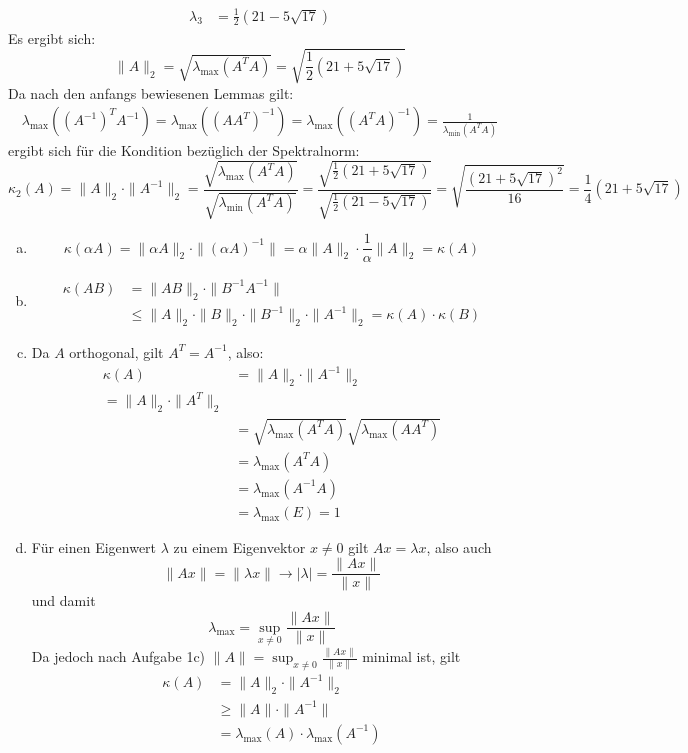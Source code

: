 \documentclass{mywork}
\begin{document}
\begin{aufgabe}
\begin{align*}
		\lambda_3&=\frac 12(21-5\sqrt{17})
	\end{align*}
	Es ergibt sich:
	\[
		\|A\|_2=\sqrt{\lambda_{\text{max}}(A^TA)}=\sqrt{\frac 12(21+5\sqrt{17})}
	\]
	Da nach den anfangs bewiesenen Lemmas gilt:
	\begin{align*}
		\lambda_{\text{max}}((A^{-1})^TA^{-1})
		=\lambda_{\text{max}}((AA^T)^{-1})
		=\lambda_{\text{max}}((A^TA)^{-1})
		=\frac 1{\lambda_{\text{min}}(A^TA)}
	\end{align*}
	ergibt sich für die Kondition bezüglich der Spektralnorm:
	\[
		\kappa_2(A)
		=\|A\|_2\cdot\|A^{-1}\|_2
		=\frac{\sqrt{\lambda_{\text{max}}(A^TA)}}{\sqrt{\lambda_{\text{min}}(A^TA)}}
		=\frac {\sqrt{\frac 12(21+5\sqrt{17})}}{\sqrt{\frac 12(21-5\sqrt{17})}}
		=\sqrt{\frac{(21+5\sqrt{17})^2}{16}}
		=\frac 14(21+5\sqrt{17})
	\]

\end{aufgabe}

\begin{aufgabe}
	\begin{enumerate}[(a)]
		\item
			\[
				\kappa(\alpha A)=\|\alpha A\|_2\cdot\|(\alpha A)^{-1}\|=\alpha\|A\|_2\cdot\frac 1\alpha\|A\|_2=\kappa(A)
			\]
		\item
			\begin{align*}
				\kappa(AB)&=\|AB\|_2\cdot\|B^{-1}A^{-1}\|\\
						  &\le\|A\|_2\cdot\|B\|_2\cdot\|B^{-1}\|_2\cdot\|A^{-1}\|_2=\kappa(A)\cdot\kappa(B)
			\end{align*}
		\item
			Da $A$ orthogonal, gilt $A^T=A^{-1}$, also:
			\begin{align*}
				\kappa(A)
				&=\|A\|_2\cdot\|A^{-1}\|_2\\
				=\|A\|_2\cdot\|A^T\|_2\\
				&=\sqrt{\lambda_{\text{max}}(A^TA)}\sqrt{\lambda_{\text{max}}(AA^T)}\\
				&=\lambda_{\text{max}}(A^TA)\\
				&=\lambda_{\text{max}}(A^{-1}A)\\
				&=\lambda_{\text{max}}(E)=1
			\end{align*}
		\item
			Für einen Eigenwert $\lambda$ zu einem Eigenvektor $x\neq 0$ gilt $Ax=\lambda x$, also auch
			\[
				\|Ax\|=\|\lambda x\| \longrightarrow |\lambda|=\frac {\|Ax\|}{\|x\|}
			\]
			und damit
			\[
				\lambda_{\text{max}}=\sup_{x\neq 0}\frac {\|Ax\|}{\|x\|}
			\]
			Da jedoch nach Aufgabe 1c) $\|A\|=\sup_{x\neq 0}\frac {\|Ax\|}{\|x\|}$ minimal ist, gilt
			\begin{align*}
				\kappa(A)&=\|A\|_2\cdot\|A^{-1}\|_2\\
					&\ge \|A\|\cdot \|A^{-1}\|\\
					&=\lambda_{\text{max}}(A)\cdot \lambda_{\text{max}}(A^{-1})
			\end{align*}
	\end{enumerate}
\end{aufgabe}
\end{document}
